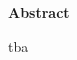 
\newpage

\vspace*{1cm}

\begin{center}
    \textbf{Abstract}
\end{center}

\vspace*{1cm}

\noindent 

tba
